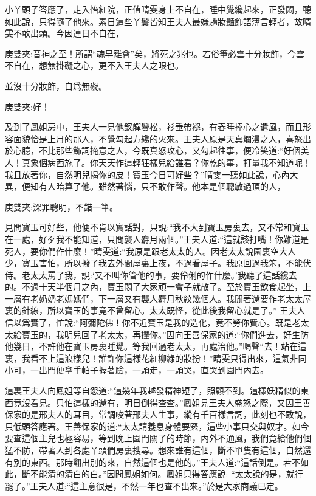 \begin{parag}
    小丫頭子答應了，走入怡紅院，正值晴雯身上不自在，睡中覺纔起來，正發悶，聽如此說，只得隨了他來。素日這些丫鬟皆知王夫人最嫌趫妝豔飾語薄言輕者，故晴雯不敢出頭。今因連日不自在，\begin{note}庚雙夾:音神之至！所謂“魂早離會”矣，將死之兆也。若俗筆必雲十分妝飾，今雲不自在，想無掛礙之心，更不入王夫人之眼也。\end{note}並沒十分妝飾，自爲無礙。\begin{note}庚雙夾:好！\end{note}及到了鳳姐房中，王夫人一見他釵軃鬢松，衫垂帶褪，有春睡捧心之遺風，而且形容面貌恰是上月的那人，不覺勾起方纔的火來。王夫人原是天真爛漫之人，喜怒出於心臆，不比那些飾詞掩意之人，今既真怒攻心，又勾起往事，便冷笑道:“好個美人！真象個病西施了。你天天作這輕狂樣兒給誰看？你乾的事，打量我不知道呢！我且放著你，自然明兒揭你的皮！寶玉今日可好些？”晴雯一聽如此說，心內大異，便知有人暗算了他。雖然著惱，只不敢作聲。他本是個聰敏過頂的人，\begin{note}庚雙夾:深罪聰明，不錯一筆。\end{note}見問寶玉可好些，他便不肯以實話對，只說:“我不大到寶玉房裏去，又不常和寶玉在一處，好歹我不能知道，只問襲人麝月兩個。”王夫人道:“這就該打嘴！你難道是死人，要你們作什麼！”晴雯道:“我原是跟老太太的人。因老太太說園裏空大人少，寶玉害怕，所以撥了我去外間屋裏上夜，不過看屋子。我原回過我笨，不能伏侍。老太太罵了我，說:‘又不叫你管他的事，要伶俐的作什麼。’我聽了這話纔去的。不過十天半個月之內，寶玉悶了大家頑一會子就散了。至於寶玉飲食起坐，上一層有老奶奶老媽媽們，下一層又有襲人麝月秋紋幾個人。我閒著還要作老太太屋裏的針線，所以寶玉的事竟不曾留心。太太既怪，從此後我留心就是了。” 王夫人信以爲實了，忙說:“阿彌陀佛！你不近寶玉是我的造化，竟不勞你費心。既是老太太給寶玉的，我明兒回了老太太，再攆你。”因向王善保家的道:“你們進去，好生防他幾日，不許他在寶玉房裏睡覺。等我回過老太太，再處治他。”喝聲“去！站在這裏，我看不上這浪樣兒！誰許你這樣花紅柳綠的妝扮！”晴雯只得出來，這氣非同小可，一出門便拿手帕子握著臉，一頭走，一頭哭，直哭到園門內去。
\end{parag}


\begin{parag}
    這裏王夫人向鳳姐等自怨道:“這幾年我越發精神短了，照顧不到。這樣妖精似的東西竟沒看見。只怕這樣的還有，明日倒得查查。”鳳姐見王夫人盛怒之際，又因王善保家的是邢夫人的耳目，常調唆著邢夫人生事，縱有千百樣言詞，此刻也不敢說，只低頭答應著。王善保家的道:“太太請養息身體要緊，這些小事只交與奴才。如今要查這個主兒也極容易，等到晚上園門關了的時節，內外不通風，我們竟給他們個猛不防，帶著人到各處丫頭們房裏搜尋。想來誰有這個，斷不單隻有這個，自然還有別的東西。那時翻出別的來，自然這個也是他的。”王夫人道:“這話倒是。若不如此，斷不能清的清白的白。”因問鳳姐如何。鳳姐只得答應說: “太太說的是，就行罷了。”王夫人道:“這主意很是，不然一年也查不出來。”於是大家商議已定。
\end{parag}


